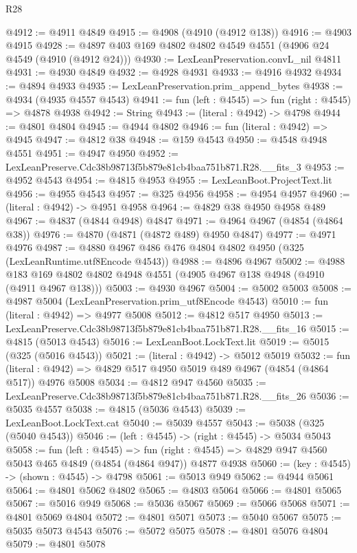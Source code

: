 \begin{lexlean}{R28}
\begin{coremodule}
@4912 := @4911 @4849
@4915 := @4908 (@4910 (@4912 @138))
@4916 := @4903 @4915
@4928 := @4897 @403 @169 @4802 @4802 @4549 @4551 (@4906 @24 @4549 (@4910 (@4912 @24)))
@4930 := LexLeanPreservation.convL_nil @4811
@4931 := @4930 @4849
@4932 := @4928 @4931
@4933 := @4916 @4932
@4934 := @4894 @4933
@4935 := LexLeanPreservation.prim_append_bytes
@4938 := @4934 (@4935 @4557 @4543)
@4941 := fun (left : @4545) => fun (right : @4545) => @4878 @4938
@4942 := String
@4943 := (literal : @4942) -> @4798
@4944 := @4801 @4804
@4945 := @4944 @4802
@4946 := fun (literal : @4942) => @4945
@4947 := @4812 @38
@4948 := @159 @4543
@4950 := @4548 @4948 @4551
@4951 := @4947 @4950
@4952 := LexLeanPreserve.Cdc38b98713f5b879e81cb4baa751b871.R28.__fits_3
@4953 := @4952 @4543
@4954 := @4815 @4953
@4955 := LexLeanBoot.ProjectText.lit
@4956 := @4955 @4543
@4957 := @325 @4956
@4958 := @4954 @4957
@4960 := (literal : @4942) -> @4951 @4958
@4964 := @4829 @38 @4950 @4958 @489
@4967 := @4837 (@4844 @4948) @4847
@4971 := @4964 @4967 (@4854 (@4864 @38))
@4976 := @4870 (@4871 (@4872 @489) @4950 @4847)
@4977 := @4971 @4976
@4987 := @4880 @4967 @486 @476 @4804 @4802 @4950 (@325 (LexLeanRuntime.utf8Encode @4543))
@4988 := @4896 @4967
@5002 := @4988 @183 @169 @4802 @4802 @4948 @4551 (@4905 @4967 @138 @4948 (@4910 (@4911 @4967 @138)))
@5003 := @4930 @4967
@5004 := @5002 @5003
@5008 := @4987 @5004 (LexLeanPreservation.prim_utf8Encode @4543)
@5010 := fun (literal : @4942) => @4977 @5008
@5012 := @4812 @517 @4950
@5013 := LexLeanPreserve.Cdc38b98713f5b879e81cb4baa751b871.R28.__fits_16
@5015 := @4815 (@5013 @4543)
@5016 := LexLeanBoot.LockText.lit
@5019 := @5015 (@325 (@5016 @4543))
@5021 := (literal : @4942) -> @5012 @5019
@5032 := fun (literal : @4942) => @4829 @517 @4950 @5019 @489 @4967 (@4854 (@4864 @517)) @4976 @5008
@5034 := @4812 @947 @4560
@5035 := LexLeanPreserve.Cdc38b98713f5b879e81cb4baa751b871.R28.__fits_26
@5036 := @5035 @4557
@5038 := @4815 (@5036 @4543)
@5039 := LexLeanBoot.LockText.cat
@5040 := @5039 @4557
@5043 := @5038 (@325 (@5040 @4543))
@5046 := (left : @4545) -> (right : @4545) -> @5034 @5043
@5058 := fun (left : @4545) =>
  fun (right : @4545) => @4829 @947 @4560 @5043 @465 @4849 (@4854 (@4864 @947)) @4877 @4938
@5060 := (key : @4545) -> (shown : @4545) -> @4798
@5061 := @5013 @949
@5062 := @4944 @5061
@5064 := @4801 @5062 @4802
@5065 := @4803 @5064
@5066 := @4801 @5065
@5067 := @5016 @949
@5068 := @5036 @5067
@5069 := @5066 @5068
@5071 := @4801 @5069 @4804
@5072 := @4801 @5071
@5073 := @5040 @5067
@5075 := @5035 @5073 @4543
@5076 := @5072 @5075
@5078 := @4801 @5076 @4804
@5079 := @4801 @5078

\end{coremodule}
\end{lexlean}
